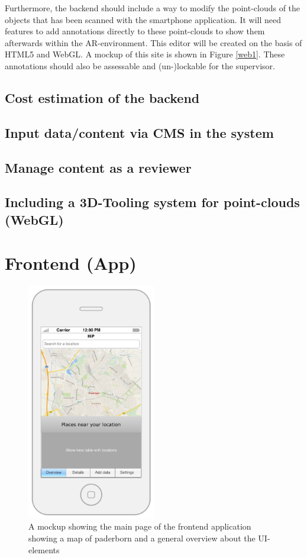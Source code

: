 Furthermore, the backend should include a way to modify the point-clouds of the objects that has been scanned with the smartphone application. It will need features to add annotations directly to these point-clouds to show them afterwards within the \ac{AR}-environment. This editor will be created on the basis of \ac{HTML5} and \ac{WebGL}. A mockup of this site is shown in Figure \ref{web1}. These annotations should also be assessable and (un-)lockable for the supervisor. 

\subsection{Cost estimation of the backend}

\subsection{Input data/content via CMS in the system}

\subsection{Manage content as a reviewer}

\subsection{Including a 3D-Tooling system for point-clouds (WebGL)}

\section{Frontend (App)}
\begin{figure}[th]
\centerline{\includegraphics[width=0.5\textwidth]{gfx/mockup_app_1}}
\caption{A mockup showing the main page of the frontend application showing a map of paderborn and a general overview about the UI-elements}
\label{app1}
\end{figure}

